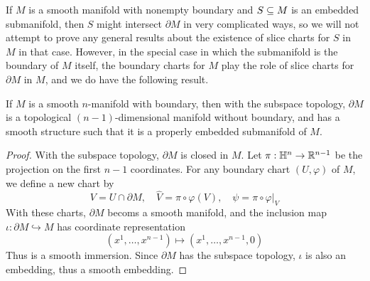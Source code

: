 If $M$ is a smooth manifold with nonempty boundary and $S\subseteq M$ is an embedded submanifold, then $S$ might intersect $\partial M$ in very complicated ways, so we will not attempt to prove any general results about the existence of slice charts for $S$ in $M$ in that case. However, in the special case in which the submanifold is the boundary of $M$ itself, the boundary charts for $M$ play the role of slice charts for $\partial M$ in $M$, and we do have the following result.
\begin{theorem}\label{boundary embedd mani}
If $M$ is a smooth $n$-manifold with boundary, then with the subspace topology, $\partial M$ is a topological $(n-1)$-dimensional manifold without boundary, and has a smooth structure such that it is a properly embedded submanifold of $M$.
\end{theorem}
\begin{proof}
With the subspace topology, $\partial M$ is closed in $M$. Let $\pi:\mathbb{H}^n\to\mathbb{R}^{n-1}$ be the projection on the first $n-1$ coordinates. For any boundary chart $(U,\varphi)$ of $M$, we define a new chart by
\[V=U\cap\partial M,\quad \widehat{V}=\pi\circ\varphi(V),\quad\psi=\pi\circ\varphi|_V\]
With these charts, $\partial M$ becoms a smooth manifold, and the inclusion map $\iota:\partial M\hookrightarrow M$ has coordinate representation 
\[(x^1,\dots,x^{n-1})\mapsto(x^1,\dots,x^{n-1},0)\]
Thus is a smooth immersion. Since $\partial M$ has the subspace topology, $\iota$ is also an embedding, thus a smooth embedding.
\end{proof}
